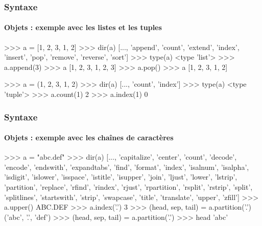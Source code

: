 \begin{frame}[fragile]
\frametitle{Syntaxe}
\framesubtitle{Objets : exemple avec les listes et les tuples}
\begin{pythonConsole}
>>> a = [1, 2, 3, 1, 2]
>>> dir(a)
[..., 'append', 'count', 'extend', 'index', 'insert', 'pop', 
'remove', 'reverse', 'sort']
>>> type(a)
<type 'list'>
>>> a.append(3)
>>> a 
[1, 2, 3, 1, 2, 3]
>>> a.pop()
>>> a 
[1, 2, 3, 1, 2]
\end{pythonConsole}
\begin{pythonConsole}
>>> a = (1, 2, 3, 1, 2)
>>> dir(a)
[..., 'count', 'index']
>>> type(a)
<type 'tuple'>
>>> a.count(1)
2
>>> a.index(1)
0
\end{pythonConsole}
\end{frame}
\begin{frame}[fragile]
\frametitle{Syntaxe}
\framesubtitle{Objets : exemple avec les chaînes de caractères}
\begin{pythonConsole}
>>> a = "abc.def"
>>> dir(a)
[..., 'capitalize', 'center', 'count', 'decode', 'encode', 'endswith', 
'expandtabs', 'find', 'format', 'index', 'isalnum', 'isalpha', 'isdigit',
'islower', 'isspace', 'istitle', 'isupper', 'join', 'ljust', 'lower', 'lstrip',
'partition', 'replace', 'rfind', 'rindex', 'rjust', 'rpartition', 'rsplit',
'rstrip', 'split', 'splitlines', 'startswith', 'strip', 'swapcase', 'title',
'translate', 'upper', 'zfill']
>>> a.upper()
ABC.DEF
>>> a.index('.')
3
>>> (head, sep, tail) = a.partition('.')
('abc', '.', 'def')
>>> (head, sep, tail) = a.partition('.')
>>> head
'abc'
\end{pythonConsole}
\end{frame}

